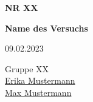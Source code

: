 \begin{titlepage}
\begin{center}
    \vspace*{2.5cm}
    \Huge
    \textbf{NR XX} %
    
    \textbf{Name des Versuchs} %
    
    \large
    
    \vspace*{12cm}
    
    09.02.2023 %
    
    \vspace*{1cm}
    
    Gruppe XX \\ %
    \href{mailto:erika.mustermann@tu-dortmund.de}{Erika Mustermann} \\ %
    \href{mailto:max.mustermann@tu-dortmund.de}{Max Mustermann} \\ %
\end{center}


\end{titlepage}


\tableofcontents
\newpage

